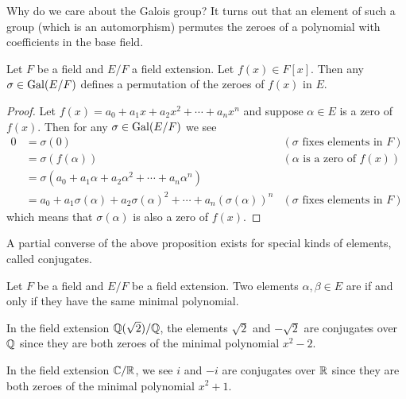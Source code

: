Why do we care about the Galois group? It turns out that an element of such a group (which is an automorphism) permutes the zeroes of a polynomial with coefficients in the base field.

\begin{proposition}\label{prop-galois-field-automorphism-permutes-zeroes-of-polynomial}
    Let $F$ be a field and $E/F$ a field extension. Let $f(x) \in F[x]$. Then any $\sigma \in \mathrm{Gal}(E/F)$ defines a permutation of the zeroes of $f(x)$ in $E$.
\end{proposition}
\begin{proof}
    Let $f(x) = a_0 + a_1x + a_2x^2 + \cdots + a_nx^n$ and suppose $\alpha \in E$ is a zero of $f(x)$. Then for any $\sigma \in \mathrm{Gal}(E/F)$ we see
    \begin{align*}
        0 &= \sigma(0) & (\sigma \text{ fixes elements in }F)\\
        &= \sigma(f(\alpha)) & (\alpha \text{ is a zero of }f(x))\\
        &= \sigma(a_0 + a_1\alpha + a_2\alpha^2 + \cdots + a_n\alpha^n)\\
        &= a_0 + a_1\sigma(\alpha) + a_2\sigma(\alpha)^2 + \cdots + a_n(\sigma(\alpha))^n & (\sigma \text{ fixes elements in }F)
    \end{align*}
    which means that $\sigma(\alpha)$ is also a zero of $f(x)$.
\end{proof}

A partial converse of the above proposition exists for special kinds of elements, called conjugates.

\begin{definition}
    Let $F$ be a field and $E/F$ be a field extension. Two elements $\alpha,\beta \in E$ are  if and only if they have the same minimal polynomial.
\end{definition}

\begin{example}
    In the field extension $\mathbb{Q}(\sqrt2)/\mathbb{Q}$, the elements $\sqrt2$ and $-\sqrt2$ are conjugates over $\mathbb{Q}$ since they are both zeroes of the minimal polynomial $x^2 - 2$.
\end{example}

\begin{example}
    In the field extension $\mathbb{C}/\mathbb{R}$, we see $i$ and $-i$ are conjugates over $\mathbb{R}$ since they are both zeroes of the minimal polynomial $x^2 + 1$.
\end{example}

